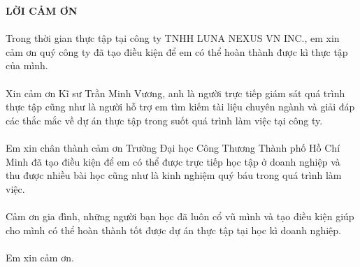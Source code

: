 	\pagestyle{fancy}
	\fancyhf{}
	\chead{\thepage}
	\renewcommand{\headrulewidth}{0pt}
	\begin{center}
		\setcounter{page}{1}
		\fontsize{16}{20}\selectfont
		\textbf{LỜI CẢM ƠN\\} 
	\end{center}
	\fontsize{13}{13}\selectfont
	\paragraph{}
	Trong thời gian thực tập tại công ty TNHH LUNA NEXUS VN INC., em xin cảm ơn quý công ty đã tạo điều kiện để em có thể hoàn thành được kì thực tập của mình.
	\paragraph{}
	Xin cảm ơn Kĩ sư Trần Minh Vương, anh là người trực tiếp giám sát quá trình thực tập cũng như là người hỗ trợ em tìm kiếm tài liệu chuyên ngành và giải đáp các thắc mắc về dự án thực tập trong suốt quá trình làm việc tại công ty.

	\paragraph{}
	Em xin chân thành cảm ơn Trường Đại học Công Thương Thành phố Hồ Chí Minh đã tạo điều kiện để em có thể được trực tiếp học tập ở doanh nghiệp và thu được nhiều bài học cũng như là kinh nghiệm quý báu trong quá trình làm việc.
	\paragraph{}
	Cảm ơn gia đình, những người bạn học đã luôn cổ vũ mình và tạo điều kiện giúp cho mình có thể hoàn thành tốt được dự án thực tập tại học kì doanh nghiệp.
	\paragraph{}
	Em xin cảm ơn.
	\pagebreak	